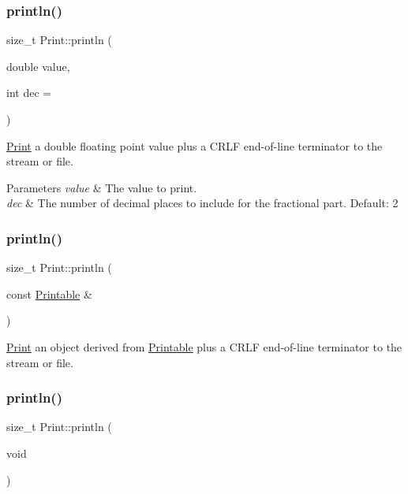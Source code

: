\subsubsection{\texorpdfstring{println()}{println()}\hspace{0.1cm}{\footnotesize\ttfamily [18/21]}}
{\footnotesize\ttfamily size\+\_\+t Print\+::println (\begin{DoxyParamCaption}\item[{double}]{value,  }\item[{int}]{dec = {} }\end{DoxyParamCaption})}



\hyperlink{class_print}{Print} a double floating point value plus a C\+R\+LF end-\/of-\/line terminator to the stream or file. 


\begin{DoxyParams}{Parameters}
{\em value} & The value to print. \\
\hline
{\em dec} & The number of decimal places to include for the fractional part. Default\+: 2 \\
\hline
\end{DoxyParams}
\mbox{\label{class_print_a20f9e104153b62e720c9b4c348b44f00}} 
\subsubsection{\texorpdfstring{println()}{println()}\hspace{0.1cm}{\footnotesize\ttfamily [19/21]}}
{\footnotesize\ttfamily size\+\_\+t Print\+::println (\begin{DoxyParamCaption}\item[{const \hyperlink{class_printable}{Printable} \&}]{ }\end{DoxyParamCaption})}



\hyperlink{class_print}{Print} an object derived from \hyperlink{class_printable}{Printable} plus a C\+R\+LF end-\/of-\/line terminator to the stream or file. 

\mbox{\label{class_print_a169b128f9e22f0c15883768f580541a2}} 
\subsubsection{\texorpdfstring{println()}{println()}\hspace{0.1cm}{\footnotesize\ttfamily [20/21]}}
{\footnotesize\ttfamily size\+\_\+t Print\+::println (\begin{DoxyParamCaption}\item[{void}]{ }\end{DoxyParamCaption})}



